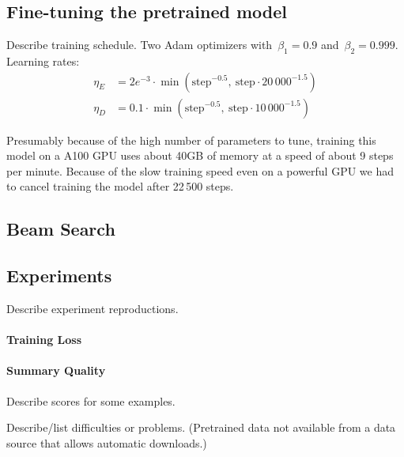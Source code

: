 \subsection{Fine-tuning the pretrained model}

Describe training schedule.
Two Adam optimizers with~\(\beta_1 = 0.9\) and~\(\beta_2 = 0.999\).
Learning rates:
\begin{align}
    \eta_E &= 2e^{-3} \cdot \min( \text{step}^{-0.5},\ \text{step} \cdot 20\,000^{-1.5} ) \\
    \eta_D &= 0.1 \cdot \min( \text{step}^{-0.5},\ \text{step} \cdot 10\,000^{-1.5} )
\end{align}

Presumably because of the high number of parameters to tune, training this \BertSumAbs model on a A100 GPU uses about 40GB of memory at a speed of about 9 steps per minute.
Because of the slow training speed even on a powerful GPU we had to cancel training the model after 22\,500 steps.

\subsection{Beam Search}

\subsection{Experiments}

Describe experiment reproductions.

\paragraph{Training Loss}




\paragraph{Summary Quality}

Describe \Rouge scores for some examples.

Describe/list difficulties or problems. (Pretrained data not available from a data source that allows automatic downloads.)
